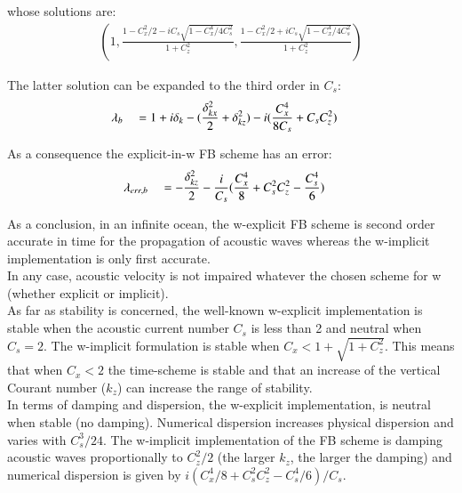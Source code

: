 \documentclass[a4paper,11pt]{article}
\begin{document}
whose solutions are:
\begin{equation}
   \begin{split}
    \displaystyle
    (1,\frac{1-C_{x}^2/2-iC_s\sqrt{1-C_{x}^4/ 4 C_s^2 }}{1+C_{z}^2}
      ,\frac{1-C_{x}^2/2+iC_s\sqrt{1-C_{x}^4/ 4 C_s^2}}{1+C_{z}^2})
   \end{split}
\end{equation}

The latter solution can be expanded to the third order in $C_s$:
\begin{equation}
   \begin{split}
    \displaystyle   
    & \lambda_b && = 1 + i \delta_k - (\frac{\delta_{kx}^2}{2}+\delta_{kz}^2) 
    - i(\frac{C_{x}^4}{8C_s}+C_s C_{z}^2)
   \end{split}
   \label{dispers_ac}
\end{equation}

As a consequence the explicit-in-w FB scheme has an error:
\begin{equation}
   \begin{split}
    \displaystyle   
    & \lambda_{err,b} && = - \frac{\delta_{kz}^2}{2} 
    - \frac{i}{C_s}(\frac{C_{x}^4}{8}+C_s^2 C_{z}^2-\frac{C_{s}^4}{6})
   \end{split}
\end{equation}

As a conclusion, in an infinite ocean, the w-explicit FB scheme is second order accurate in time for the propagation of acoustic waves whereas the w-implicit implementation is only first accurate.\\ In any case, acoustic velocity is not impaired whatever the chosen scheme for w (whether explicit or implicit).\\
As far as stability is concerned, the well-known w-explicit implementation is stable when the acoustic current number $C_s$ is less than 2 and neutral when $C_s=2$. The w-implicit formulation is stable when $C_x < 1+\sqrt{1+C_z^2}$. This means that when $C_x < 2$ the time-scheme is stable and that an increase of the vertical Courant number ($k_z$) can increase the range of stability.\\
In terms of damping and dispersion, the w-explicit implementation, is neutral when stable (no damping).  Numerical dispersion increases physical dispersion and varies with $C_s^3/24$. The w-implicit implementation of the FB scheme is damping acoustic waves proportionally to $C_z^2/2$ (the larger $k_z$, the larger the damping) and numerical dispersion is given by $i(C_x^4/8+C_s^2 C_z^2-C_{s}^4/6)/C_s$.
\end{document}

